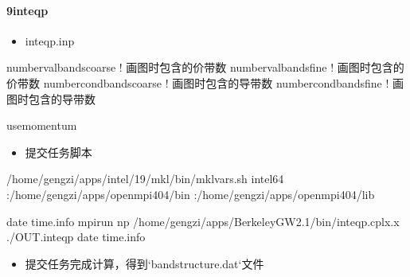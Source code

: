 \documentclass[a4paper,12pt,english]{sphinxmanual}
\begin{document}
\paragraph{9\sphinxhyphen{}inteqp}
\label{\detokenize{tutorials/berkeleygw/gw:inteqp}}\begin{itemize}
\item {} 
\sphinxAtStartPar
inteqp.inp

\end{itemize}

\begin{sphinxVerbatim}[commandchars=\\\{\}]
number\PYGZus{}val\PYGZus{}bands\PYGZus{}coarse   ! 画图时包含的价带数
number\PYGZus{}val\PYGZus{}bands\PYGZus{}fine     ! 画图时包含的价带数
number\PYGZus{}cond\PYGZus{}bands\PYGZus{}coarse  ! 画图时包含的导带数
number\PYGZus{}cond\PYGZus{}bands\PYGZus{}fine    ! 画图时包含的导带数

use\PYGZus{}momentum
\end{sphinxVerbatim}
\begin{itemize}
\item {} 
\sphinxAtStartPar
提交任务脚本

\end{itemize}

\begin{sphinxVerbatim}[commandchars=\\\{\}]

 
 /home/gengzi/apps/intel/19/mkl/bin/mklvars.sh intel64
 :/home/gengzi/apps/openmpi404/bin
 :/home/gengzi/apps/openmpi404/lib

date  \PYGZgt{}\PYGZgt{} time.info
mpirun \PYGZhy{}np  /home/gengzi/apps/BerkeleyGW\PYGZhy{}2.1/bin/inteqp.cplx.x \PYGZgt{} ./OUT.inteqp
date  \PYGZgt{}\PYGZgt{} time.info
\end{sphinxVerbatim}
\begin{itemize}
\item {} 
\sphinxAtStartPar
提交任务完成计算，得到`bandstructure.dat`文件

\end{itemize}
\end{document}
